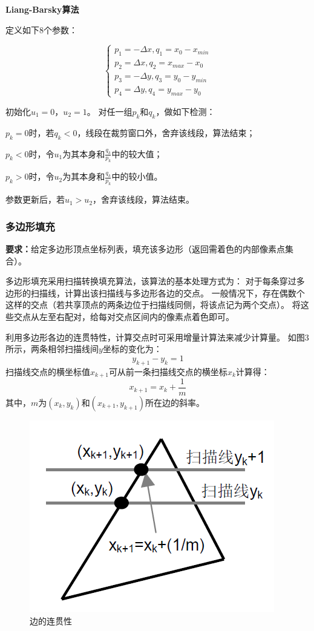 \documentclass[a4paper,UTF8]{article}
\begin{document}
\textbf{Liang-Barsky算法}

定义如下8个参数：

\begin{equation*}
    \begin{cases}
        p_1=-\Delta x,q_1=x_0-x_{min}\\
        p_2=\Delta x,q_2=x_{max}-x_0\\
        p_3=-\Delta y,q_3=y_0-y_{min}\\
        p_4=\Delta y,q_4=y_{max}-y_0
    \end{cases}
\end{equation*}

初始化$u_1=0$，$u_2=1$。
对任一组$p_k$和$q_k$，做如下检测：

$p_k=0$时，若$q_k<0$，线段在裁剪窗口外，舍弃该线段，算法结束；

$p_k<0$时，令$u_1$为其本身和$\frac{q_k}{p_k}$中的较大值；

$p_k>0$时，令$u_2$为其本身和$\frac{q_k}{p_k}$中的较小值。

参数更新后，若$u_1>u_2$，舍弃该线段，算法结束。


\subsubsection{多边形填充}
\textbf{要求：}给定多边形顶点坐标列表，填充该多边形（返回需着色的内部像素点集合）。

多边形填充采用扫描转换填充算法，该算法的基本处理方式为：
对于每条穿过多边形的扫描线，计算出该扫描线与多边形各边的交点。
一般情况下，存在偶数个这样的交点（若共享顶点的两条边位于扫描线同侧，将该点记为两个交点）。
将这些交点从左至右配对，给每对交点区间内的像素点着色即可。

利用多边形各边的连贯特性，计算交点时可采用增量计算法来减少计算量。
如图3所示，两条相邻扫描线间$y$坐标的变化为：
\begin{equation*}
	y_{k+1}-y_k=1
\end{equation*}
扫描线交点的横坐标值$x_{k+1}$可从前一条扫描线交点的横坐标$x_{k}$计算得：
\begin{equation*}
	x_{k+1}=x_k+\frac{1}{m}
\end{equation*}
其中，$m$为$(x_k,y_k)$和$(x_{k+1},y_{k+1})$所在边的斜率。

\begin{figure}[H]
	\centering
	\includegraphics[scale=0.6]{polygon-fill.PNG}
	\caption{边的连贯性}
\end{figure}
\end{document}

